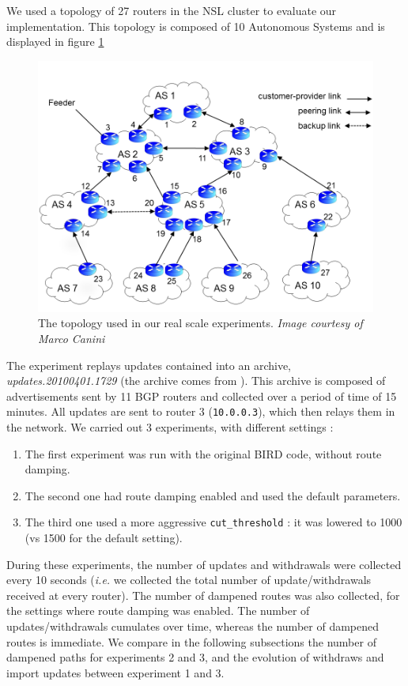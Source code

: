\documentclass[a4paper,english]{IEEEtran}
\begin{document}
We used a topology of 27 routers in the NSL cluster to evaluate
our implementation.
This topology is composed of 10 Autonomous Systems and is displayed in figure \ref{fig_topo}
\begin{figure}
\begin{center}
\includegraphics[scale=.3]{img/topology.png}
\end{center}
\caption{The topology used in our real scale experiments. \textit{Image courtesy of Marco Canini}}
\label{fig_topo}
\end{figure}

The experiment replays updates contained into an archive,
\textsl{updates.20100401.1729} (the archive comes from \cite{routeviews}).
This archive is composed of advertisements sent by 11 BGP routers and collected
over a period of time of 15 minutes.
All updates are sent to router 3 (\texttt{\small 10.0.0.3}), which then relays them
in the network.
We carried out 3 experiments, with different settings :

\begin{enumerate}
\item The first experiment was run with the original BIRD code, without route damping.
\item The second one had route damping enabled and used the default parameters.
\item The third one used a more aggressive \texttt{\small cut\_threshold} : it was lowered to 1000 (vs 1500 for the default setting).
\end{enumerate}

During these experiments, the number of updates and withdrawals were collected every 10 seconds (\textit{i.e.} we collected the total 
number of update/withdrawals received at every router).
The number of dampened routes was also collected, for the settings where route damping was enabled.
The number of updates/withdrawals cumulates over time, whereas the number of dampened routes is immediate.
We compare in the following subsections the number of dampened paths for experiments 2 and 3, and the evolution of 
withdraws and import updates between experiment 1 and 3.
\end{document}
